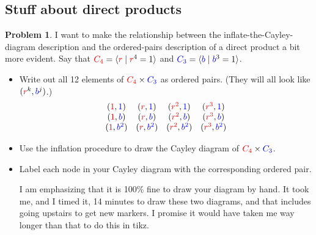 \documentclass[12pt]{article}
\theoremstyle{definition} %
\newtheorem{problem}{Problem}
\newcommand{\Alert}[1]{\textcolor{xRed}{#1}}
\newcommand{\Balert}[1]{\textcolor{xBlue}{#1}}
\def\<{\langle}
\def\>{\rangle}
\newenvironment{red}{\color{red}}{\ignorespacesafterend}
\begin{document}
\subsection*{Stuff about direct products}

\begin{problem}
    I want to make the relationship between the inflate-the-Cayley-diagram description and the ordered-pairs description of a direct product a bit more evident. Say that $\Alert{C_4} = \<\Alert{r} \mid \Alert{r}^4 = 1\>$ and $\Balert{C_3} = \< \Balert{b} \mid \Balert{b}^3 = 1\>$. 
    \begin{itemize}
        \item Write out all 12 elements of $\Alert{C_4}\times \Balert{C_3}$ as ordered pairs. (They will all look like $(\Alert{r}^k, \Balert{b}^j)$.)
        \[
        \begin{array}{cccc}
            (\Alert{1}  , \Balert{1}) & 
            (\Alert{r}  , \Balert{1}) &
            (\Alert{r^2}, \Balert{1}) &
            (\Alert{r^3}, \Balert{1}) \\
            (\Alert{1}  , \Balert{b}) & 
            (\Alert{r}  , \Balert{b}) &
            (\Alert{r^2}, \Balert{b}) &
            (\Alert{r^3}, \Balert{b}) \\
            (\Alert{1}  , \Balert{b^2}) & 
            (\Alert{r}  , \Balert{b^2}) &
            (\Alert{r^2}, \Balert{b^2}) &
            (\Alert{r^3}, \Balert{b^2})
        \end{array}
        \]
        \item Use the inflation procedure to draw the Cayley diagram of $\Alert{C_4}\times \Balert{C_3}$.
        \item Label each node in your Cayley diagram with the corresponding ordered pair.

        \begin{red}
            I am emphasizing that it is 100\% fine to draw your diagram by hand. It took me, and I timed it, 14 minutes to draw these two diagrams, and that includes going upstairs to get new markers. I promise it would have taken me way longer than that to do this in tikz. 
        \end{red}


\end{itemize}
\end{problem}
\end{document}
